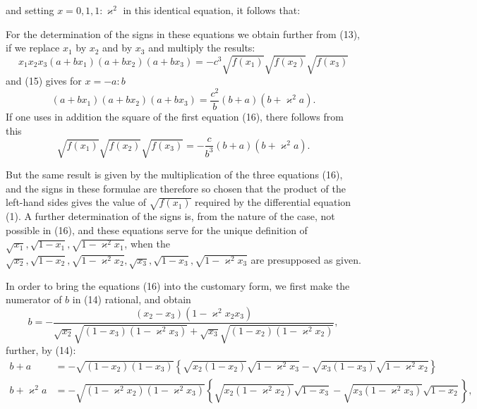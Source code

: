 and setting $x = 0, 1, 1:\varkappa^2$ in this identical equation, it
follows that:

For the determination of the signs in these equations we obtain
further from (13), if we replace $x_1$ by $x_2$ and by $x_3$
and multiply the results:
\[ x_1x_2x_3(a+bx_1)(a+bx_2)(a+bx_3) = -c^3\sqrt{f(x_1)}\sqrt{f(x_2)}\sqrt{f(x_3)} \]
and (15) gives for $x = -a:b$
\[ (a+bx_1)(a+bx_2)(a+bx_3) = \dfrac{c^2}{b}(b+a)(b+\varkappa^2a). \]
If one uses in addition the square of the first equation (16),
there follows from this
\[ \sqrt{f(x_1)}\sqrt{f(x_2)}\sqrt{f(x_3)} = -\dfrac{c}{b^3}(b+a)(b+\varkappa^2a). \]

But the same result is given by the multiplication of the three
equations (16), and the signs in these formulae are therefore so
chosen that the product of the left-hand sides gives the value of
$\sqrt{f(x_1)}$ required by the differential equation (1). A further
determination of the signs is, from the nature of the case, not
possible in (16), and these equations serve for the unique
definition of $\sqrt{x_1}, \sqrt{1-x_1}, \sqrt{1-\varkappa^2x_1}$, when the
$\sqrt{x_2}, \sqrt{1-x_2}, \sqrt{1-\varkappa^2x_2}, \sqrt{x_3}, \sqrt{1-x_3}, \sqrt{1-\varkappa^2x_3}$ are
presupposed as given.

In order to bring the equations (16) into the customary form, we
first make the numerator of $b$ in (14) rational, and obtain
\[ b = -\dfrac{(x_2-x_3)(1-\varkappa^2x_2x_3)}{\sqrt{x_2}\sqrt{(1-x_3)(1-\varkappa^2x_3)} + \sqrt{x_3}\sqrt{(1-x_2)(1-\varkappa^2x_2)}}, \]
further, by (14):
\[ \begin{aligned}
b+a &= -\sqrt{(1-x_2)(1-x_3)}\left\{\sqrt{x_2(1-x_2)}\sqrt{1-\varkappa^2x_3} - \sqrt{x_3(1-x_3)}\sqrt{1-\varkappa^2x_2}\right\} \\
b+\varkappa^2a &= -\sqrt{(1-\varkappa^2x_2)(1-\varkappa^2x_3)}\left\{\sqrt{x_2(1-\varkappa^2x_2)}\sqrt{1-x_3} - \sqrt{x_3(1-\varkappa^2x_3)}\sqrt{1-x_2}\right\},
\end{aligned} \]
